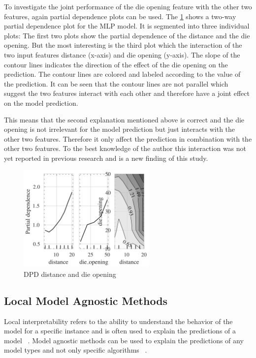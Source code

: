 To investigate the joint performance of the die opening feature with the other two features,
again partial dependence plots can be used.
The \cref{fig:dpd-distance-die-opening} shows a two-way partial dependence plot for the \ac{MLP} model.
It is segmented into three individual plots: The first two plots show the partial dependence of the distance and the
die opening.
But the most interesting is the third plot which the interaction of the two input features distance (x-axis) and die
opening (y-axis).
The slope of the contour lines indicates the direction of the effect of the die opening on the
prediction.
The contour lines are colored and labeled according to the value of the prediction.
It can be seen that the contour lines are not parallel which suggest the two features interact
with each other and therefore have a joint effect on the model prediction.

This means that the second explanation mentioned above is correct and the die opening is not irrelevant for the
model prediction but just interacts with the other two features.
Therefore it only affect the prediction in combination with the other two features.
To the best knowledge of the author this interaction was not yet reported in previous research and is a new
finding of this study.


\begin{figure}[h]
    \begin{tcolorbox}[arc=0pt,boxrule=0.5pt]
        \centering
        \includegraphics[width=0.6\textwidth]{chap5/images/pdp_distance_die_opening}
    \end{tcolorbox}
    \caption{DPD distance and die opening}
    \label{fig:dpd-distance-die-opening}
\end{figure}

\subsection{Local Model Agnostic Methods}\label{subsec:local-model-agnostic-methods}
Local interpretability refers to the ability to understand the behavior of the model for a
specific instance and is often used to explain the predictions of a model
~\cite[p. 19]{hall2019introduction}.
Model agnostic methods can be used to explain the predictions of any model types and not only specific algorithms
~\cite[p. 20]{hall2019introduction}.

